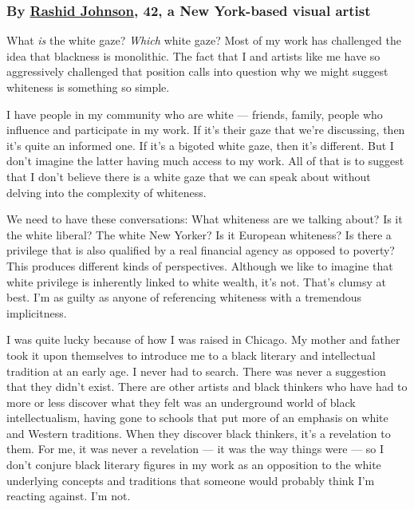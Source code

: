 \hypertarget{by-rashid-johnson-42-a-new-york-based-visual-artist}{%
\subsubsection{\texorpdfstring{\textbf{By}
\textbf{\href{https://www.instagram.com/rashidjohnson/}{Rashid Johnson},
42, a New York-based visual
artist}}{By Rashid Johnson, 42, a New York-based visual artist}}\label{by-rashid-johnson-42-a-new-york-based-visual-artist}}

What \emph{is} the white gaze? \emph{Which} white gaze? Most of my work
has challenged the idea that blackness is monolithic. The fact that I
and artists like me have so aggressively challenged that position calls
into question why we might suggest whiteness is something so simple.

I have people in my community who are white --- friends, family, people
who influence and participate in my work. If it's their gaze that we're
discussing, then it's quite an informed one. If it's a bigoted white
gaze, then it's different. But I don't imagine the latter having much
access to my work. All of that is to suggest that I don't believe there
is a white gaze that we can speak about without delving into the
complexity of whiteness.

We need to have these conversations: What whiteness are we talking
about? Is it the white liberal? The white New Yorker? Is it European
whiteness? Is there a privilege that is also qualified by a real
financial agency as opposed to poverty? This produces different kinds of
perspectives. Although we like to imagine that white privilege is
inherently linked to white wealth, it's not. That's clumsy at best. I'm
as guilty as anyone of referencing whiteness with a tremendous
implicitness.

I was quite lucky because of how I was raised in Chicago. My mother and
father took it upon themselves to introduce me to a black literary and
intellectual tradition at an early age. I never had to search. There was
never a suggestion that they didn't exist. There are other artists and
black thinkers who have had to more or less discover what they felt was
an underground world of black intellectualism, having gone to schools
that put more of an emphasis on white and Western traditions. When they
discover black thinkers, it's a revelation to them. For me, it was never
a revelation --- it was the way things were --- so I don't conjure black
literary figures in my work as an opposition to the white underlying
concepts and traditions that someone would probably think I'm reacting
against. I'm not.

